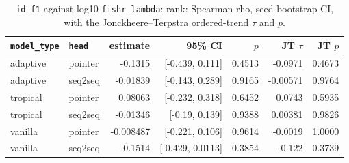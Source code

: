 \documentclass[10pt]{article}
\begin{document}
{\small
\begin{longtable}{llrrrrr}
\caption{\texttt{id\_f1} against log10 \texttt{fishr\_lambda}: rank: Spearman rho, seed-bootstrap CI, with the Jonckheere--Terpstra ordered-trend $\tau$ and $p$.}\label{tab:trend-id_f1}\\
\toprule
\texttt{model\_type} & \texttt{head} & estimate & 95\% CI & $p$ & JT $\tau$ & JT $p$\\
\midrule
\endhead
adaptive & pointer & -0.1315 & [-0.439, 0.111] & 0.4513 & -0.0971 & 0.4673\\
adaptive & seq2seq & -0.01839 & [-0.143, 0.289] & 0.9165 & -0.00571 & 0.9764\\
tropical & pointer & 0.08063 & [-0.232, 0.318] & 0.6452 & 0.0743 & 0.5935\\
tropical & seq2seq & -0.01346 & [-0.19, 0.139] & 0.9388 & 0.00381 & 0.9826\\
vanilla & pointer & -0.008487 & [-0.221, 0.106] & 0.9614 & -0.0019 & 1.0000\\
vanilla & seq2seq & -0.1514 & [-0.429, 0.0113] & 0.3854 & -0.122 & 0.3739\\
\bottomrule
\end{longtable}
}
\end{document}
